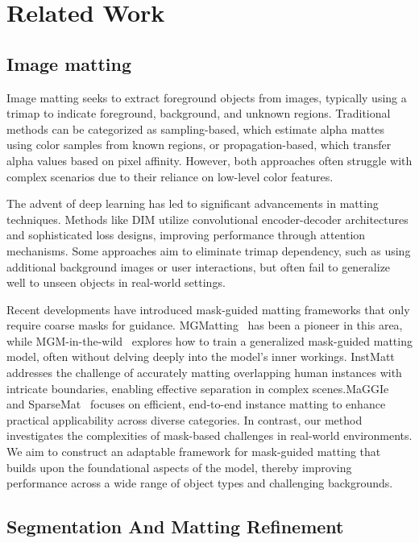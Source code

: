 \section{Related Work}\label{sec:related_work}

\vspace{-3pt}
\subsection{Image matting}

Image matting seeks to extract foreground objects from images, typically using a trimap to indicate foreground, background, and unknown regions. Traditional methods can be categorized as sampling-based, which estimate alpha mattes using color samples from known regions, or propagation-based, which transfer alpha values based on pixel affinity. However, both approaches often struggle with complex scenarios due to their reliance on low-level color features. 

The advent of deep learning has led to significant advancements in matting techniques. Methods like DIM utilize convolutional encoder-decoder architectures and sophisticated loss designs, improving performance through attention mechanisms. Some approaches aim to eliminate trimap dependency, such as using additional background images or user interactions, but often fail to generalize well to unseen objects in real-world settings. 

Recent developments have introduced mask-guided matting frameworks that only require coarse masks for guidance. MGMatting~\cite{yu2021mgm} has been a pioneer in this area, while MGM-in-the-wild~\cite{park2023mgmwild} explores how to train a generalized mask-guided matting model, often without delving deeply into the model's inner workings. InstMatt~\cite{sun2022instmatt} addresses the challenge of accurately matting overlapping human instances with intricate boundaries, enabling effective separation in complex scenes.MaGGIe~\cite{huynh2024maggie} and SparseMat~\cite{sun2023sparsemat} focuses on efficient, end-to-end instance matting to enhance practical applicability across diverse categories. In contrast, our method investigates the complexities of mask-based challenges in real-world environments. We aim to construct an adaptable framework for mask-guided matting that builds upon the foundational aspects of the model, thereby improving performance across a wide range of object types and challenging backgrounds.

\subsection{Segmentation And Matting Refinement}

